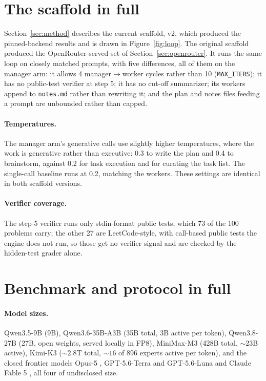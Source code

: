 \documentclass{article}
\begin{document}



\appendix

\section{The scaffold in full}
\label{app:scaffold}

Section~\ref{sec:method} describes the current scaffold, v2, which produced the pinned-backend
results and is drawn in Figure~\ref{fig:loop}. The original scaffold produced the
OpenRouter-served set of Section~\ref{sec:openrouter}. It runs the same loop on closely matched
prompts, with five differences, all of them on the manager arm: it allows 4 manager$\to$worker
cycles rather than 10 (\texttt{MAX\_ITERS}); it has no public-test verifier at step 5; it has no
cut-off summarizer; its workers append to \texttt{notes.md} rather than rewriting it; and the plan
and notes files feeding a prompt are unbounded rather than capped.

\paragraph{Temperatures.} The manager arm's generative calls use slightly higher temperatures,
where the work is generative rather than executive: 0.3 to write the plan and 0.4 to brainstorm,
against 0.2 for task execution and for curating the task list. The single-call baseline runs at
0.2, matching the workers. These settings are identical in both scaffold versions.

\paragraph{Verifier coverage.} The step-5 verifier runs only stdin-format public tests, which 73
of the 100 problems carry; the other 27 are LeetCode-style, with call-based public tests the
engine does not run, so those get no verifier signal and are checked by the hidden-test grader
alone.

\section{Benchmark and protocol in full}
\label{app:protocol}

\paragraph{Model sizes.} Qwen3.5-9B \citep{qwen2026a} (9B), Qwen3.6-35B-A3B \citep{qwen2026b} (35B
total, 3B active per token), Qwen3.8-27B \citep{qwen2026c} (27B, open weights, served locally in
FP8), MiniMax-M3 \citep{minimax2026} (428B total, ${\sim}23$B active), Kimi-K3
\citep{moonshot2026} (${\sim}2.8$T total, ${\sim}16$ of 896 experts active per token), and the
closed frontier models Opus-5 \citep{anthropic2026}, GPT-5.6-Terra and GPT-5.6-Luna
\citep{openai2026} and Claude Fable 5 \citep{anthropic2026}, all four of undisclosed size.
\end{document}
